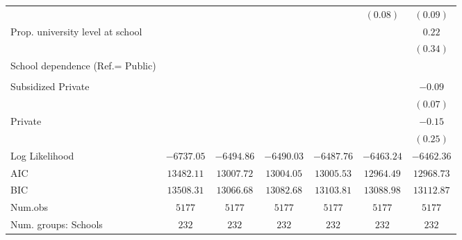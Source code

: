 \documentclass[
  12pt,
  letterpaper,
]{article}
\begin{document}
\begin{table}
{\begin{center}
{\begin{threeparttable}
\begin{tabular}{l c c c c c c}
                                                       &               &               &               &               & $(0.08)$      & $(0.09)$      \\
Prop. university level at school                       &               &               &               &               &               & $0.22$        \\
                                                       &               &               &               &               &               & $(0.34)$      \\
School dependence (Ref.= Public)                       &               &               &               &               &               &               \\
                                                       &               &               &               &               &               &               \\
\quad Subsidized Private                               &               &               &               &               &               & $-0.09$       \\
                                                       &               &               &               &               &               & $(0.07)$      \\
\quad Private                                          &               &               &               &               &               & $-0.15$       \\
                                                       &               &               &               &               &               & $(0.25)$      \\
\midrule
Log Likelihood                                         & $-6737.05$    & $-6494.86$    & $-6490.03$    & $-6487.76$    & $-6463.24$    & $-6462.36$    \\
AIC                                                    & $13482.11$    & $13007.72$    & $13004.05$    & $13005.53$    & $12964.49$    & $12968.73$    \\
BIC                                                    & $13508.31$    & $13066.68$    & $13082.68$    & $13103.81$    & $13088.98$    & $13112.87$    \\
Num.obs                                                & $5177$        & $5177$        & $5177$        & $5177$        & $5177$        & $5177$        \\
Num. groups: Schools                                   & $232$         & $232$         & $232$         & $232$         & $232$         & $232$         \\

\end{tabular}
\end{threeparttable}}
\end{center}}
\end{table}
\end{document}
